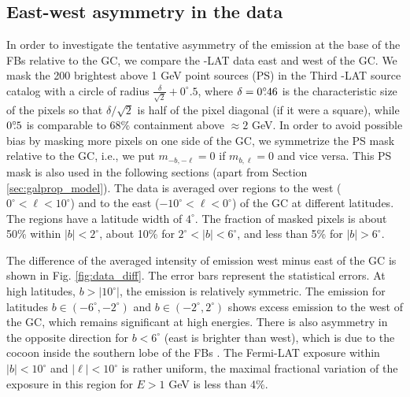\subsection{East-west  asymmetry in the data}
\label{sec:data_diff}

In order to investigate the tentative asymmetry of the emission at the base of the FBs relative to the GC, 
we compare the \Fermi-LAT data east and west of the GC. 
We mask the 200 brightest above 1 GeV point sources (PS) in the Third \Fermi-LAT source catalog \citep[3FGL,][]{2015ApJS..218...23A}
with a circle of radius $\frac{\delta}{\sqrt{2}} + 0^\circ\!\!.5$, where $\delta = 0^\circ\!\!.46$ is the characteristic size of the pixels
so that ${\delta}/{\sqrt{2}}$ is half of the pixel diagonal (if it were a square), while $0^\circ\!\!.5$ is comparable to 68\% containment
above $\approx 2$ GeV.
In order to avoid possible bias by masking more pixels on one side of the GC,
we symmetrize the PS mask relative to the GC, i.e., we put $m_{-b, -\ell} = 0$ if $m_{b, \ell} = 0$ and vice versa.
This PS mask is also used in the following sections (apart from Section \ref{sec:galprop_model}).
The data is averaged over regions to the west ($0^\circ < \ell < 10^\circ$) and to the east ($-10^\circ < \ell  <  0^\circ$) 
of the GC at different latitudes. 
The regions have a latitude width of $4^\circ$. 
The fraction of masked pixels is about 50\% within $|b| < 2^\circ$, about 10\% for $2^\circ < |b| < 6^\circ$, and less than  5\% 
for $|b| > 6^\circ$.

The difference of the averaged intensity of emission west minus east of the GC is shown in Fig. \ref{fig:data_diff}. 
The error bars represent the statistical errors.
At high latitudes, $b >|10^\circ|$, the emission is relatively symmetric. 
The emission for latitudes $b \in (-6^\circ, -2^\circ)$ and $b \in (-2^\circ, 2^\circ)$ shows excess emission to the west of the GC, 
which remains significant at high energies. 
There is also asymmetry in the opposite direction for $b < 6^\circ$ (east is brighter than west), which is due to the cocoon inside the 
southern lobe of the FBs \citep{2012ApJ...753...61S, 2014ApJ...793...64A}.
The Fermi-LAT exposure within $|b| < 10^\circ$ and $|\ell| < 10^\circ$ is rather uniform, 
the maximal fractional variation of the exposure in this region for $E > 1$ GeV is less than 4\%.

